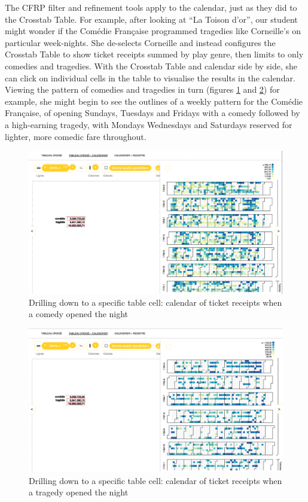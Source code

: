 \documentclass[	DIV=calc,%
							paper=a4,%
							fontsize=11pt,%
							twocolumn]{scrartcl}	 					%
\begin{document}
The CFRP filter and refinement tools apply to the calendar, just as they did to the Crosstab Table.  For example, after looking at ``La Toison d'or'', our student might wonder if the Comédie Française programmed tragedies like Corneille's on particular week-nights.  She de-selects Corneille and instead configures the Crosstab Table to show ticket receipts summed by play genre, then limits to only comedies and tragedies.  With the Crosstab Table and calendar side by side, she can click on individual cells in the table to visualise the results in the calendar.  Viewing the pattern of comedies and tragedies in turn (figures \ref{fig:comedies-calendar} and \ref{fig:tragedies-calendar}) for example, she might begin to see the outlines of a weekly pattern for the Comédie Française, of opening Sundays, Tuesdays and Fridays with a comedy followed by a high-earning tragedy, with Mondays Wednesdays and Saturdays reserved for lighter, more comedic fare throughout.

\begin{figure}
  \centering
	\includegraphics[width=7in]{steps/comedies-calendar.png}
	\caption{Drilling down to a specific table cell: calendar of ticket receipts when a comedy opened the night}
	\label{fig:comedies-calendar}
\end{figure}

\begin{figure}
  \centering
	\includegraphics[width=7in]{steps/tragedies-calendar.png}
	\caption{Drilling down to a specific table cell: calendar of ticket receipts when a tragedy opened the night}
	\label{fig:tragedies-calendar}
\end{figure}
\end{document}
